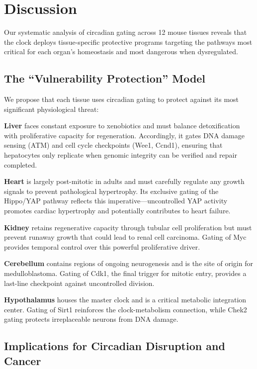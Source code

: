 \documentclass[10pt,letterpaper]{article}
\begin{document}
\section{Discussion}

Our systematic analysis of circadian gating across 12 mouse tissues reveals that the clock deploys tissue-specific protective programs targeting the pathways most critical for each organ's homeostasis and most dangerous when dysregulated.

\subsection{The ``Vulnerability Protection'' Model}

We propose that each tissue uses circadian gating to protect against its most significant physiological threat:

\textbf{Liver} faces constant exposure to xenobiotics and must balance detoxification with proliferative capacity for regeneration. Accordingly, it gates DNA damage sensing (ATM) and cell cycle checkpoints (Wee1, Ccnd1), ensuring that hepatocytes only replicate when genomic integrity can be verified and repair completed.

\textbf{Heart} is largely post-mitotic in adults and must carefully regulate any growth signals to prevent pathological hypertrophy. Its exclusive gating of the Hippo/YAP pathway reflects this imperative—uncontrolled YAP activity promotes cardiac hypertrophy and potentially contributes to heart failure.

\textbf{Kidney} retains regenerative capacity through tubular cell proliferation but must prevent runaway growth that could lead to renal cell carcinoma. Gating of Myc provides temporal control over this powerful proliferative driver.

\textbf{Cerebellum} contains regions of ongoing neurogenesis and is the site of origin for medulloblastoma. Gating of Cdk1, the final trigger for mitotic entry, provides a last-line checkpoint against uncontrolled division.

\textbf{Hypothalamus} houses the master clock and is a critical metabolic integration center. Gating of Sirt1 reinforces the clock-metabolism connection, while Chek2 gating protects irreplaceable neurons from DNA damage.

\subsection{Implications for Circadian Disruption and Cancer}
\end{document}

